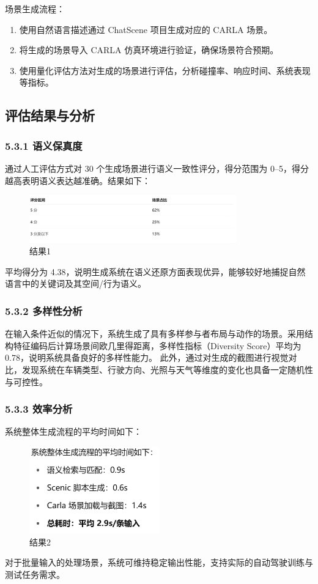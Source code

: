 \documentclass{article}
\begin{document}
场景生成流程：
\begin{enumerate}
	\item 使用自然语言描述通过 ChatScene 项目生成对应的 CARLA 场景。
	\item 将生成的场景导入 CARLA 仿真环境进行验证，确保场景符合预期。
	\item 使用量化评估方法对生成的场景进行评估，分析碰撞率、响应时间、系统表现等指标。
\end{enumerate}

\subsection{评估结果与分析}
\subsubsection{5.3.1 语义保真度}
通过人工评估方式对 30 个生成场景进行语义一致性评分，得分范围为 0–5，得分越高表明语义表达越准确。结果如下：
\begin{figure}[h]
	\centering
	\includegraphics[width=0.8\textwidth]{"screenshots/图片1.png"}
	\caption{结果1}
	\label{fig:example}
\end{figure}
平均得分为 4.38，说明生成系统在语义还原方面表现优异，能够较好地捕捉自然语言中的关键词及其空间/行为语义。

\subsubsection{5.3.2 多样性分析}
在输入条件近似的情况下，系统生成了具有多样参与者布局与动作的场景。采用结构特征编码后计算场景间欧几里得距离，多样性指标（Diversity Score）平均为 0.78，说明系统具备良好的多样性能力。
此外，通过对生成的截图进行视觉对比，发现系统在车辆类型、行驶方向、光照与天气等维度的变化也具备一定随机性与可控性。

\subsubsection{5.3.3 效率分析}
系统整体生成流程的平均时间如下：
\begin{figure}[h]
	\centering
	\includegraphics[width=0.5\textwidth]{"screenshots/图片2.png"}
	\caption{结果2}
	\label{fig:example2}
\end{figure}
对于批量输入的处理场景，系统可维持稳定输出性能，支持实际的自动驾驶训练与测试任务需求。
\newpage
\end{document}
